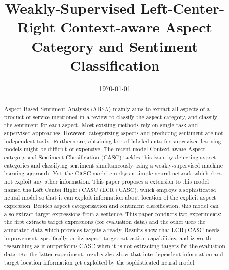 \documentclass[american, oneside]{ecsgdp}
\begin{document}
\newcommand{\modelname}{MODELNAME }

\frontmatter
\title{Weakly-Supervised Left-Center-Right Context-aware Aspect Category and Sentiment Classification}
\addresses{\groupname\\\deptname\\\univname}
\date{\today}

% 

\maketitle

\begin{abstract}
    {\footnotesize
    Aspect-Based Sentiment Analysis (ABSA) mainly aims to extract all aspects of a product or service mentioned in a review to classify the aspect category, and classify the sentiment for each aspect. Most existing methods rely on single-task and supervised approaches. However, categorizing aspects and predicting sentiment are not independent tasks. Furthermore, obtaining lots of labeled data for supervised learning models might be difficult or expensive. The recent model Context-aware Aspect category and Sentiment Classification (CASC) \textcite{Kumar2021CASC} tackles this issue by detecting aspect categories and classifying sentiment simultaneously using a weakly-supervised machine learning approach. Yet, the CASC model employs a simple neural network which does not exploit any other information. This paper proposes a extension to this model named the Left-Center-Right+CASC (LCR+CASC), which employs a sophisticated neural model so that it can exploit information about location of the explicit aspect expression. Besides aspect categorization and sentiment classification, this model can also extract target expressions from a sentence. This paper conducts two experiments: the first extracts target expressions (for evaluation data) and the other uses the annotated data which provides targets already. Results show that LCR+CASC needs improvement, specifically on its aspect target extraction capabilities, and is worth researching as it outperforms CASC when it is not extracting targets for the evaluation data. For the latter experiment, results also show that interdependent information and target location information get exploited by the sophisticated neural model.
    }
\end{abstract}
\end{document}
